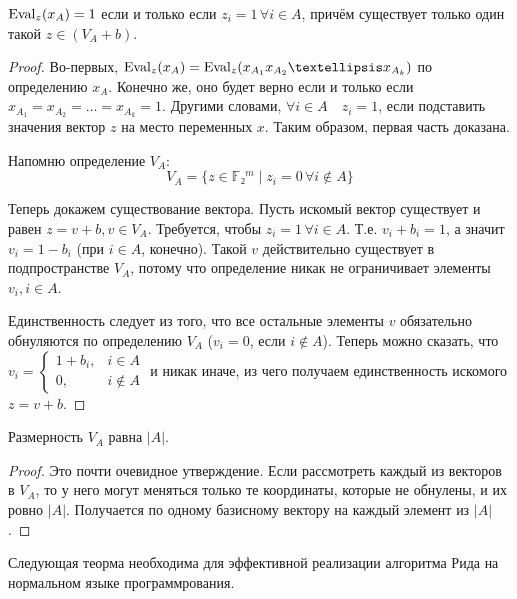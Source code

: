 \begin{lemma*}
    $\operatorname{Eval}_z(x_A) = 1$ если и только если $z_i = 1\, ∀i∈A$, причём существует только один такой $z ∈ (V_A + b)$.
\end{lemma*}
\begin{proof}
    Во-первых, $\Eval_z(x_A) = \Eval_z(x_{A_1}x_{A_2}…x_{A_k})$ по определению $x_A$. Конечно же, оно будет верно если и только если $x_{A_1} = x_{A_2} = … = x_{A_k} = 1$. Другими словами, $∀i∈A\quad z_i = 1$, если подставить значения вектор $z$ на место переменных $x$. Таким образом, первая часть доказана.

    Напомню определение $V_A$:
    \[
    V_A = \{z ∈ 𝔽₂^m \mid z_i = 0 \,∀i \not\in A\}
    \]

    Теперь докажем существование вектора. Пусть искомый вектор существует и равен $z = v + b, v ∈ V_A$. Требуется, чтобы $z_i = 1\,∀i∈A$. Т.е. $v_i + b_i = 1$, а значит $v_i = 1 - b_i$ (при $i∈A$, конечно). Такой $v$ действительно существует в подпространстве $V_A$, потому что определение никак не ограничивает элементы $v_i, i∈A$.

    Единственность следует из того, что все остальные элементы $v$ обязательно обнуляются по определению $V_A$ ($v_i = 0$, если $i\not\in A$). Теперь можно сказать, что $v_i = \begin{cases}1 + b_i,&i∈A\\0,& i\not\in A\end{cases}$ и никак иначе, из чего получаем единственность искомого $z = v + b$.
\end{proof}

\begin{lemma*}
    Размерность $V_A$ равна $|A|$.
\end{lemma*}
\begin{proof}
    Это почти очевидное утверждение. Если рассмотреть каждый из векторов в $V_A$, то у него могут меняться только те координаты, которые не обнулены, и их ровно $|A|$. Получается по одному базисному вектору на каждый элемент из $|A|$.
\end{proof}

Следующая теорма необходима для эффективной реализации алгоритма Рида на нормальном языке программрования.

